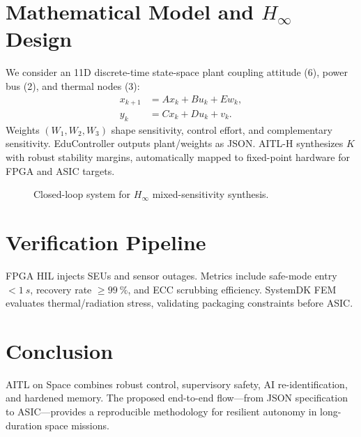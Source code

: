 \documentclass[conference]{IEEEtran}
\begin{document}
\section{Mathematical Model and $H_\infty$ Design}
We consider an 11D discrete-time state-space plant coupling attitude (6), power bus (2), and thermal nodes (3):
\begin{align}
x_{k+1} &= A x_k + B u_k + E w_k, \\
y_k &= C x_k + D u_k + v_k.
\end{align}
Weights $(W_1, W_2, W_3)$ shape sensitivity, control effort, and complementary sensitivity. EduController outputs plant/weights as JSON. AITL-H synthesizes $K$ with robust stability margins, automatically mapped to fixed-point hardware for FPGA and ASIC targets.

\begin{figure}[t]
\centering
{}
\caption{Closed-loop system for $H_\infty$ mixed-sensitivity synthesis.}
\label{fig:loop}
\end{figure}

\section{Verification Pipeline}
FPGA HIL injects SEUs and sensor outages. Metrics include safe-mode entry $<\SI{1}{s}$, recovery rate $\ge\SI{99}{\percent}$, and ECC scrubbing efficiency. SystemDK FEM evaluates thermal/radiation stress, validating packaging constraints before ASIC.

\section{Conclusion}
AITL on Space combines robust control, supervisory safety, AI re-identification, and hardened memory. The proposed end-to-end flow---from JSON specification to ASIC---provides a reproducible methodology for resilient autonomy in long-duration space missions.
\end{document}
